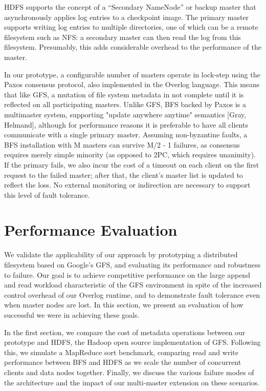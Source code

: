\documentclass{article}
\begin{document}
HDFS supports the concept of a ``Secondary NameNode'' or backup master
that asynchronously applies log entries to a checkpoint image.  The
primary master supports writing log entries to multiple directories,
one of which can be a remote filesystem such as NFS: a secondary
master can then read the log from this filesystem.  Presumably, this
adds considerable overhead to the performance of the master.
 
In our prototype, a configurable number of masters operate in
lock-step using the Paxos consensus protocol, also implemented in the
Overlog language.  This means that like GFS, a mutation of file system metadata in not complete until it is reflected on all participating masters.  Unlike GFS, BFS backed by Paxos is a multimaster system, supporting "update anywhere anytime" semantics [Gray, Helmand], although for performance reasons it is preferable to have all clients communicate with a single primary master.  Assuming non-byzantine faults, a BFS installation with M masters can survive M/2 - 1 failures, as consensus requires merely simple minority (as opposed to 2PC, which requires unanimity).  If the primary fails, we also incur the cost of a timeout on each client on the first request to the failed master; after that, the client's master list is updated to reflect the loss.  No external monitoring or indirection are necessary to support this level of fault tolerance.

\section{Performance Evaluation}
\label{perf-eval}
We validate the applicability of our approach by prototyping a
distributed filesystem based on Google's GFS, and evaluating its
performance and robustness to failure.  Our goal is to achieve
competitive performance on the large append and read workload
characteristic of the GFS environment in spite of the increased
control overhead of our Overlog runtime, and to demonstrate fault
tolerance even when master nodes are lost.  In this section, we
present an evaluation of how successful we were in achieving these
goals.

In the first section, we compare the cost of metadata operations
between our prototype and HDFS, the Hadoop open source implementation
of GFS.  Following this, we simulate a MapReduce sort benchmark,
comparing read and write performance between BFS and HDFS as we scale
the number of concurrent clients and data nodes together.  Finally, we
discuss the various failure modes of the architecture and the impact
of our multi-master extension on these scenarios.
\end{document}
